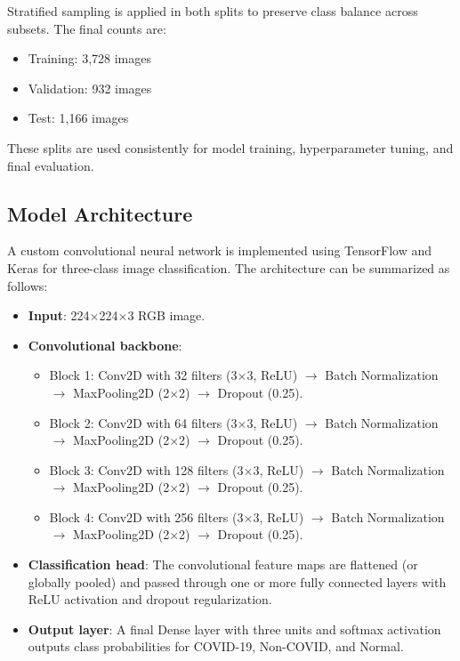 \documentclass[conference]{IEEEtran}
\begin{document}
Stratified sampling is applied in both splits to preserve class balance across subsets. The final counts are:
\begin{itemize}
    \item Training: 3{,}728 images
    \item Validation: 932 images
    \item Test: 1{,}166 images
\end{itemize}

These splits are used consistently for model training, hyperparameter tuning, and final evaluation.

\subsection{Model Architecture}

A custom convolutional neural network is implemented using TensorFlow and Keras for three-class image classification. The architecture can be summarized as follows:
\begin{itemize}
    \item \textbf{Input}: 224$\times$224$\times$3 RGB image.
    \item \textbf{Convolutional backbone}:
    \begin{itemize}
        \item Block 1: Conv2D with 32 filters (3$\times$3, ReLU) $\rightarrow$ Batch Normalization $\rightarrow$ MaxPooling2D (2$\times$2) $\rightarrow$ Dropout (0.25).
        \item Block 2: Conv2D with 64 filters (3$\times$3, ReLU) $\rightarrow$ Batch Normalization $\rightarrow$ MaxPooling2D (2$\times$2) $\rightarrow$ Dropout (0.25).
        \item Block 3: Conv2D with 128 filters (3$\times$3, ReLU) $\rightarrow$ Batch Normalization $\rightarrow$ MaxPooling2D (2$\times$2) $\rightarrow$ Dropout (0.25).
        \item Block 4: Conv2D with 256 filters (3$\times$3, ReLU) $\rightarrow$ Batch Normalization $\rightarrow$ MaxPooling2D (2$\times$2) $\rightarrow$ Dropout (0.25).
    \end{itemize}
    \item \textbf{Classification head}: The convolutional feature maps are flattened (or globally pooled) and passed through one or more fully connected layers with ReLU activation and dropout regularization.
    \item \textbf{Output layer}: A final Dense layer with three units and softmax activation outputs class probabilities for COVID-19, Non-COVID, and Normal.
\end{itemize}
\end{document}
